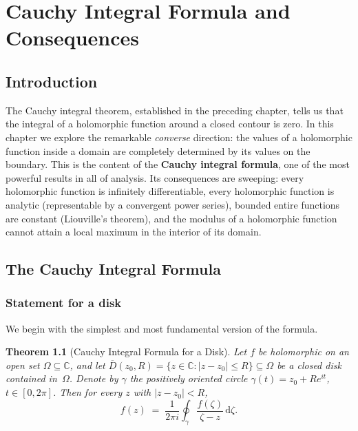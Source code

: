 \documentclass[12pt,a4paper,openany]{book}
\theoremstyle{definition}
\theoremstyle{plain}
\newtheorem{theorem}[definition]{Theorem}
\theoremstyle{remark}
\newcommand{\C}{\mathbb{C}}
\newcommand{\dd}{\mathrm{d}}
\newcommand{\abs}[1]{\left|#1\right|}
\begin{document}
\chapter{Cauchy Integral Formula and Consequences}
\label{chap:cauchy-formula}

\section*{Introduction}

The Cauchy integral theorem, established in the preceding chapter, tells us that
the integral of a holomorphic function around a closed contour is zero. In this
chapter we explore the remarkable \emph{converse} direction: the values of a
holomorphic function inside a domain are completely determined by its values on
the boundary. This is the content of the \textbf{Cauchy integral formula}, one
of the most powerful results in all of analysis. Its consequences are sweeping:
every holomorphic function is infinitely differentiable, every holomorphic
function is analytic (representable by a convergent power series), bounded entire
functions are constant (Liouville's theorem), and the modulus of a holomorphic
function cannot attain a local maximum in the interior of its domain.

\section{The Cauchy Integral Formula}
\label{sec:cauchy-formula}

\subsection{Statement for a disk}

We begin with the simplest and most fundamental version of the formula.

\begin{theorem}[Cauchy Integral Formula for a Disk]\label{thm:cauchy-integral-formula-disk}
Let $f$ be holomorphic on an open set $\Omega\subseteq\C$, and let
$\overline{D}(z_0,R) = \{z\in\C : \abs{z-z_0}\le R\}\subseteq\Omega$ be a
closed disk contained in~$\Omega$. Denote by $\gamma$ the positively oriented
circle $\gamma(t)=z_0+Re^{it}$, $t\in[0,2\pi]$. Then for every $z$ with
$\abs{z-z_0}<R$,
\begin{equation}\label{eq:cauchy-formula}
  f(z) \;=\; \frac{1}{2\pi i}\oint_\gamma \frac{f(\zeta)}{\zeta - z}\,\dd\zeta.
\end{equation}
\end{theorem}
\end{document}

